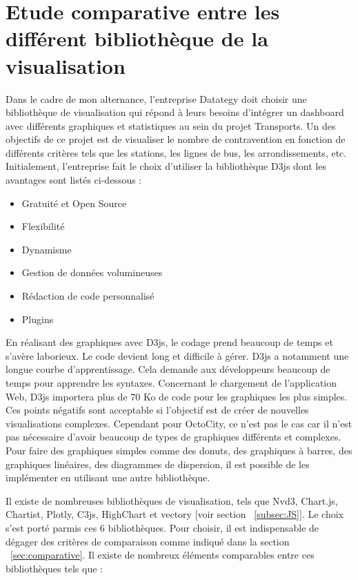 \documentclass[french, a4paper, 12pt]{report}
\begin{document}
\section{Etude comparative entre les différent bibliothèque de la visualisation}
Dans le cadre de mon alternance, l’entreprise Datategy doit choisir une bibliothèque de visualisation qui répond à leurs besoins d’intégrer un dashboard avec différents graphiques et statistiques au sein du projet Transports. Un des objectifs de ce projet est de visualiser le nombre de contravention en fonction de différents critères tels que les stations, les lignes de bus, les arrondissements, etc. 
Initialement, l’entreprise fait le choix d’utiliser la bibliothèque D3js dont les avantages sont listés ci-dessous :
\begin{itemize}
  \item Gratuité et Open Source
  \item Flexibilité
  \item Dynamisme
  \item Gestion de données volumineuses
  \item Rédaction de code personnalisé
  \item Plugins
\end{itemize}

En réalisant des graphiques avec D3js, le codage prend beaucoup de temps et s’avère laborieux. Le code devient long et difficile à gérer.  D3js a notamment une longue courbe d'apprentissage. Cela demande aux développeurs beaucoup de temps pour apprendre les syntaxes. 
Concernant le chargement de l’application Web, D3js importera plus de 70 Ko de code pour les graphiques les plus simples. 
Ces points négatifs sont acceptable si l'objectif est de créer de nouvelles visualisations complexes. Cependant pour OctoCity, ce n'est pas le cas car il n’est pas nécessaire d’avoir beaucoup de types de graphiques différents et complexes. Pour faire des graphiques simples comme des donuts, des graphiques à barres, des graphiques linéaires, des diagrammes de dispersion, il est possible de les implémenter en utilisant une autre bibliothèque. 

Il existe de nombreuses bibliothèques de visualisation, tels que Nvd3, Chart.js, Chartist, Plotly, C3js, HighChart et vectory [voir section ~\ref{subsec:JS}]. Le choix s’est porté parmis ces 6 bibliothèques. Pour choisir, il est indispensable de dégager des critères de comparaison comme indiqué dans la section ~\ref{sec:comparative}.
Il existe de nombreux éléments comparables entre ces bibliothèques tels que :
\end{document}
